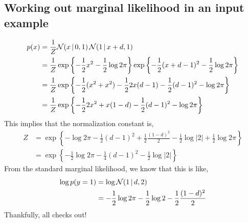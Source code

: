 \documentclass{article}
\begin{document}
\subsection*{Working out marginal likelihood in an input example}
\begin{align}
  p(x) &= \frac{1}{Z} \mathcal{N}(x \,|\, 0, 1) \, \mathcal{N}(1 \,|\, x + d, 1) \\
  &= \frac{1}{Z}
  \exp \left \{ -\frac{1}{2} x^2 -\frac{1}{2} \log 2 \pi \right \}
  \exp \left \{ -\frac{1}{2} (x+d-1)^2  -\frac{1}{2} \log 2 \pi \right \} \\
  &= \frac{1}{Z} \exp \left \{ -\frac{1}{2} (x^2 + x^2) -\frac{1}{2} 2x(d-1) -\frac{1}{2}(d-1)^2  - \log 2 \pi  \right \} \\
  &= \frac{1}{Z} \exp \left \{ -\frac{1}{2} 2x^2 + x(1-d) -\frac{1}{2}(d-1)^2  - \log 2 \pi  \right \}
\end{align}
This implies that the normalization constant is,
\begin{align}
  Z &= \exp \left \{  - \log 2 \pi -\frac{1}{2}(d-1)^2  + \frac{1}{2} \frac{(1-d)^2}{2} - \frac{1}{2} \log |2| + \frac{1}{2} \log 2 \pi \right \} \\
    &= \exp \left \{  - \frac{1}{2}\log 2 \pi -\frac{1}{4}(d-1)^2   - \frac{1}{2} \log |2| \right \} 
\end{align}
From the standard marginal likelihood, we know that this is like,
\begin{align}
  \log p(y=1) &= \log \mathcal{N}(1 \,|\, d, 2) \\
  &= -\frac{1}{2} \log 2 \pi -\frac{1}{2} \log 2 - \frac{1}{2} \frac{(1-d)^2}{2} \\
\end{align}
Thankfully, all checks out!
\end{document}
